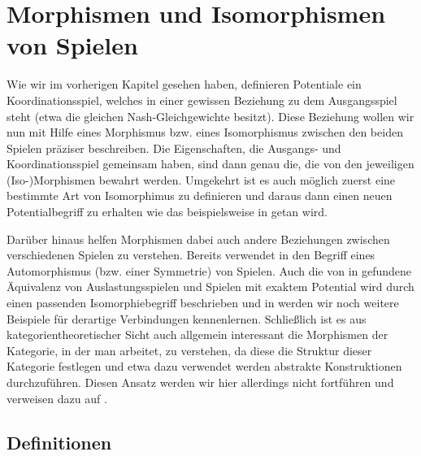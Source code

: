 \section[Morphismen]{Morphismen und Isomorphismen von Spielen}\label{sec:Morphismen}

Wie wir im vorherigen Kapitel gesehen haben, definieren Potentiale ein Koordinationsspiel, welches in einer \glqq gewissen Beziehung\grqq{} zu dem Ausgangsspiel steht (etwa die gleichen Nash-Gleichgewichte besitzt). Diese Beziehung wollen wir nun mit Hilfe eines Morphismus bzw. eines Isomorphismus zwischen den beiden Spielen präziser beschreiben. Die Eigenschaften, die Ausgangs- und Koordinationsspiel gemeinsam haben, sind dann genau die, die von den jeweiligen (Iso-)Morphismen bewahrt werden. Umgekehrt ist es auch möglich zuerst eine bestimmte Art von Isomorphimus zu definieren und daraus dann einen neuen Potentialbegriff zu erhalten wie das beispielsweise in \cite[Definitionen 5/6]{BestRespEq} getan wird.

Darüber hinaus helfen Morphismen dabei auch andere Beziehungen zwischen verschiedenen Spielen zu verstehen. Bereits \citeauthor{Nash} verwendet in \cite[S. 288f]{Nash} den Begriff eines Automorphismus (bzw. einer Symmetrie) von Spielen. Auch die von \citeauthor{MonShap} in \cite[Theorem 3.2]{MonShap} gefundene Äquivalenz von Auslastungsspielen und Spielen mit exaktem Potential wird durch einen passenden Isomorphiebegriff beschrieben und in  werden wir noch weitere Beispiele für derartige Verbindungen kennenlernen. Schließlich ist es aus kategorientheoretischer Sicht auch allgemein interessant die Morphismen der Kategorie, in der man arbeitet, zu verstehen, da diese die Struktur dieser Kategorie festlegen und etwa dazu verwendet werden abstrakte Konstruktionen durchzuführen. Diesen Ansatz werden wir hier allerdings nicht fortführen und verweisen dazu auf \cite{LapGameCat}.

\subsection{Definitionen}

